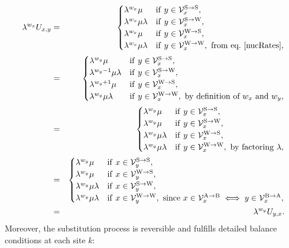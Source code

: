 \begin{align}
\lambda^{w_x} U_{x, y}
& = &
\begin{cases}
\lambda^{w_x} \mu
& \mathrm{if} \ y \in \NxSS, \\
\lambda^{w_x} \mu \lambda
& \mathrm{if} \ y \in \NxSW, \\
\lambda^{w_x} \mu
& \mathrm{if} \ y \in \NxWS, \\
\lambda^{w_x} \mu \lambda
& \mathrm{if} \ y \in \NxWW, \ \textrm{from eq.}\ \ref{nucRates},
\end{cases} \\
& = &
\begin{cases}
\lambda^{w_y} \mu
& \mathrm{if} \ y \in \NxSS, \\
\lambda^{w_y - 1} \mu \lambda
& \mathrm{if} \ y \in \NxSW, \\
\lambda^{w_y + 1} \mu
& \mathrm{if} \ y \in \NxWS, \\
\lambda^{w_y} \mu \lambda
& \mathrm{if} \ y \in \NxWW, \ \textrm{by definition of} \ w_x \ \text{and} \ w_y,
\end{cases} \\
& = &
\begin{cases}
\lambda^{w_y} \mu
& \mathrm{if} \ y \in \NxSS, \\
\lambda^{w_y} \mu
& \mathrm{if} \ y \in \NxSW, \\
\lambda^{w_y} \mu \lambda
& \mathrm{if} \ y \in \NxWS, \\
\lambda^{w_y} \mu \lambda
& \mathrm{if} \ y \in \NxWW, \ \textrm{by factoring} \ \lambda,
\end{cases} \\
& = &
\begin{cases}
\lambda^{w_y} \mu
& \mathrm{if} \ x \in \NySS, \\
\lambda^{w_y} \mu
& \mathrm{if} \ x \in \NyWS, \\
\lambda^{w_y} \mu \lambda
& \mathrm{if} \ x \in \NySW, \\
\lambda^{w_y} \mu \lambda
& \mathrm{if} \ x \in \NyWW, \ \textrm{since} \ x \in \NxAB \iff y \in \NyBA,
\end{cases} \\
& = &
\lambda^{w_y} U_{y,x}.
\label{codonMutBalance}
\end{align}
Moreover, the substitution process is reversible and fulfills detailed balance conditions at each site $k$:
